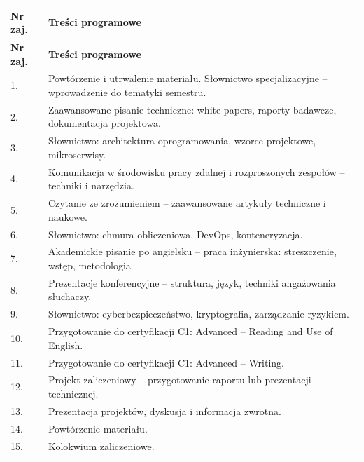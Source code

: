 \documentclass[12pt, a4paper]{article}
\newcommand{\thdrule}{\noalign{\global\setlength{\extrarowheight}{0pt}}}
\newcommand{\thdend}{\noalign{\global\setlength{\extrarowheight}{3pt}}}
\begin{document}
{\scriptsize
\begin{longtable}{m{1.5cm}m{14.5cm}}
\thdrule\toprule
\rowcolor{pjatkRed} {\color{white}\textbf{Nr zaj.}} & {\color{white}\textbf{Treści programowe}} \\
\midrule\thdend
\endfirsthead
\thdrule\toprule
\rowcolor{pjatkRed} {\color{white}\textbf{Nr zaj.}} & {\color{white}\textbf{Treści programowe}} \\
\midrule\thdend
\endhead
  \rowcolor{tableRowLight} 1. & Powtórzenie i utrwalenie materiału. Słownictwo specjalizacyjne – wprowadzenie do tematyki semestru. \\
  \rowcolor{tableRowAlt} 2. & Zaawansowane pisanie techniczne: white papers, raporty badawcze, dokumentacja projektowa. \\
  \rowcolor{tableRowLight} 3. & Słownictwo: architektura oprogramowania, wzorce projektowe, mikroserwisy. \\
  \rowcolor{tableRowAlt} 4. & Komunikacja w środowisku pracy zdalnej i rozproszonych zespołów – techniki i narzędzia. \\
  \rowcolor{tableRowLight} 5. & Czytanie ze zrozumieniem – zaawansowane artykuły techniczne i naukowe. \\
  \rowcolor{tableRowAlt} 6. & Słownictwo: chmura obliczeniowa, DevOps, konteneryzacja. \\
  \rowcolor{tableRowLight} 7. & Akademickie pisanie po angielsku – praca inżynierska: streszczenie, wstęp, metodologia. \\
  \rowcolor{tableRowAlt} 8. & Prezentacje konferencyjne – struktura, język, techniki angażowania słuchaczy. \\
  \rowcolor{tableRowLight} 9. & Słownictwo: cyberbezpieczeństwo, kryptografia, zarządzanie ryzykiem. \\
  \rowcolor{tableRowAlt} 10. & Przygotowanie do certyfikacji C1: Advanced – Reading and Use of English. \\
  \rowcolor{tableRowLight} 11. & Przygotowanie do certyfikacji C1: Advanced – Writing. \\
  \rowcolor{tableRowAlt} 12. & Projekt zaliczeniowy – przygotowanie raportu lub prezentacji technicznej. \\
  \rowcolor{tableRowLight} 13. & Prezentacja projektów, dyskusja i informacja zwrotna. \\
  \rowcolor{tableRowAlt} 14. & Powtórzenie materiału. \\
  \rowcolor{tableRowLight} 15. & Kolokwium zaliczeniowe. \\
\bottomrule
\end{longtable}}
\end{document}
